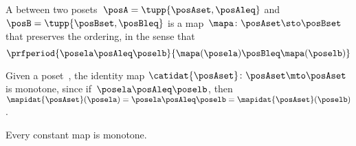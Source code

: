 \begin{definition}
    \label{def:monotone}
    A \emph{} between two posets~$\posA=\tupp{\posAset, \posAleq}$ and~$\posB=\tupp{\posBset, \posBleq}$ is a map~$\mapa \colon \posAset \sto \posBset$ that preserves the ordering, in the sense that
    \begin{equation}\label{eq:monotone-map-definition}
        \prfperiod{
            \posela \posAleq \poselb
        }{
            \mapa(\posela) \posBleq \mapa(\poselb)
        }
    \end{equation}
\end{definition}
\showslides{
    \begin{forslides}
        \begin{equation}\label{eq:monotone-map-identity}
            \prfperiod{
                \posela \posAleq \poselb
            }{
                \posela \posAleq \poselb
            }
        \end{equation}
        \begin{equation}\label{eq:monotone-map-discrete-1}
            \prfdoubleperiod{
                \posela \posAleq \poselb
            }{
                \posela = \poselb
            }
        \end{equation}
        \begin{equation}\label{eq:monotone-map-discrete-2}
            \prfperiod{
                \posela \posAleq \posela
            }{
                \mora(\posela) \posAleq \mora(\posela)
            }
        \end{equation}
        \begin{equation}\label{eq:monotone-map-constant}
            \prfperiod{
                \posela \posAleq \poselb
            }{
                \poselc \posAleq \poselc
            }
        \end{equation}
    \end{forslides}
}

\begin{example}
    Given a poset~\posA, the identity map $\catidat{\posAset}\colon \posAset \mto\linebreak[0] \posAset$ is monotone, since if~$\posela\posAleq \poselb$, then~$\mapidat{\posAset}(\posela)=\posela \posAleq  \poselb =  \mapidat{\posAset}(\poselb )$.
\end{example}

\begin{example}
    Every constant map is monotone.
\end{example}

